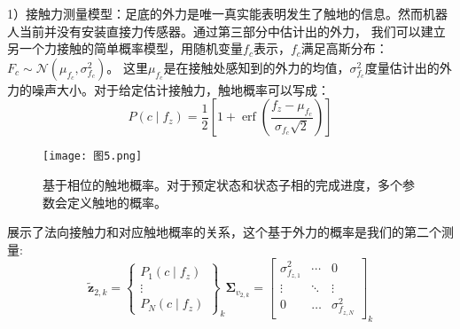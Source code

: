 1）接触力测量模型：足底的外力是唯一真实能表明发生了触地的信息。然而机器人当前并没有安装直接力传感器。通过第三部分中估计出的外力，
我们可以建立另一个力接触的简单概率模型，用随机变量$f_c$表示，$f_c$满足高斯分布：$F_c \sim \mathcal{N}\left(\mu_{f_c}, \sigma_{f_c}^2\right)$。
这里$\mu_{f_c}$是在接触处感知到的外力的均值，$\sigma_{f_c}^2$度量估计出的外力的噪声大小。对于给定估计接触力，触地概率可以写成：
\begin{equation}
    \label{equ:est_force_prob}
    P\left(c \mid f_z\right)=\frac{1}{2}\left[1+\operatorname{erf}\left(\frac{f_z-\mu_{f_c}}{\sigma_{f_c} \sqrt{2}}\right)\right]
\end{equation}
\begin{figure}[htbp]
    \centering
    \texttt{[image: 图5.png]}
    \caption{\label{fig:gauss_force}基于相位的触地概率。对于预定状态和状态子相的完成进度，多个参数会定义触地的概率。}
\end{figure}
展示了法向接触力和对应触地概率的关系，这个基于外力的概率是我们的第二个测量:
\begin{equation}
    \label{equ:est_force_noise}
    \tilde{\boldsymbol{z}}_{2, k}=\left\{\begin{array}{c}
        P_1\left(c \mid f_z\right) \\
        \vdots \\
        P_N\left(c \mid f_z\right)
        \end{array}\right\}_k \boldsymbol{\Sigma}_{v_{2, k}}=\left[\begin{array}{ccc}
        \sigma_{f_{z, 1}}^2 & \cdots & 0 \\
        \vdots & \ddots & \vdots \\
        0 & \ldots & \sigma_{f_{z, N}}^2
        \end{array}\right]_k
\end{equation}

